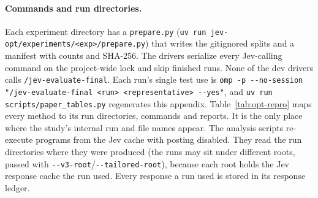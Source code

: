 \paragraph{Commands and run directories.}
Each experiment directory has a \texttt{prepare.py} (\texttt{uv run jev-opt/\allowbreak experiments/\allowbreak <exp>/\allowbreak prepare.py}) that writes the gitignored splits and a manifest with counts and SHA-256. The drivers serialize every Jev-calling command on the project-wide lock and skip finished runs. None of the dev drivers calls \texttt{/jev-evaluate-final}. Each run's single test use is \texttt{omp -p -{}-no-session "/jev-evaluate-final <run> <representative> -{}-yes"}, and \texttt{uv run scripts/\allowbreak paper\_tables.py} regenerates this appendix. Table~\ref{tab:opt-repro} maps every method to its run directories, commands and reports. It is the only place where the study's internal run and file names appear. The analysis scripts re-execute programs from the Jev cache with posting disabled. They read the run directories where they were produced (the runs may sit under different roots, passed with \texttt{-{}-v3-root}/\texttt{-{}-tailored-root}), because each root holds the Jev response cache the run used. Every response a run used is stored in its response ledger.
